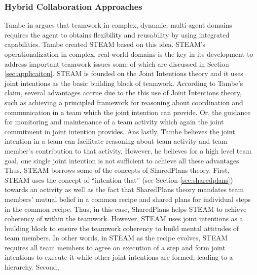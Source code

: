 \documentclass[11pt]{article}
\begin{document}
\subsubsection{Hybrid Collaboration Approaches}

Tambe in \cite{tambe:flexible-teamwork} argues that teamwork in complex,
dynamic, multi-agent domains requires the agent to obtains flexibility and
reusability by using integrated capabilities. Tambe created STEAM based on this
idea. STEAM's operationalization in complex, real-world domains is the key in
its development to address important teamwork issues some of which are discussed
in Section \ref{sec:applicaiton}. STEAM is founded on the Joint Intentions
theory and it uses joint intentions as the basic building block of teamwork.
According to Tambe's claim, several advantages accrue due to the this use of
Joint Intentions theory, such as achieving a principled framework for reasoning
about coordination and communication in a team which the joint intention can
provide. Or, the guidance for monitoring and maintenance of a team activity
which again the joint commitment in joint intention provides. Ans lastly, Tambe
believes the joint intention in a team can facilitate reasoning about team
activity and team member's contribution to that activity. However, he believes
for a high level team goal, one single joint intention is not sufficient to
achieve all these advantages. Thus, STEAM borrows some of the concepts of
SharedPlans theory. First, STEAM uses the concept of ``intention that'' (see
Section \ref{sec:sharedplans}) towards an activity as well as the fact that
SharedPlans theory mandates team members' mutual belief in a common recipe and
shared plans for individual steps in the common recipe. Thus, in this case,
SharedPlans helps STEAM to achieve coherency of within the teamwork. However,
STEAM uses joint intentions as a building block to ensure the teamwork coherency
to build mental attitudes of team members. In other words, in STEAM as the
recipe evolves, STEAM requires all team members to agree on execution of a step
and form joint intentions to execute it while other joint intentions are formed,
leading to a hierarchy. Second, 
\end{document}
